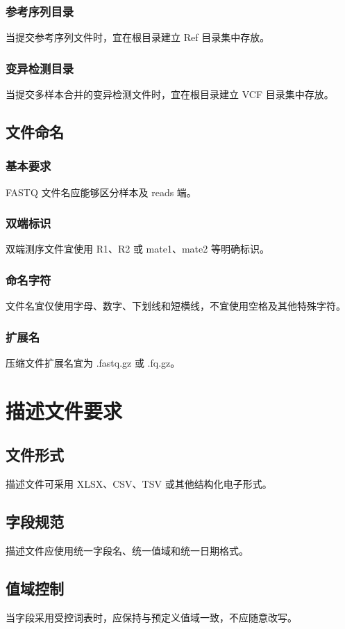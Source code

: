 \subsection{参考序列目录}
当提交参考序列文件时，宜在根目录建立 Ref 目录集中存放。

\subsection{变异检测目录}
当提交多样本合并的变异检测文件时，宜在根目录建立 VCF 目录集中存放。

\section{文件命名}
\subsection{基本要求}
FASTQ 文件名应能够区分样本及 reads 端。

\subsection{双端标识}
双端测序文件宜使用 R1、R2 或 mate1、mate2 等明确标识。

\subsection{命名字符}
文件名宜仅使用字母、数字、下划线和短横线，不宜使用空格及其他特殊字符。

\subsection{扩展名}
压缩文件扩展名宜为 .fastq.gz 或 .fq.gz。

\chapter{描述文件要求}
\section{文件形式}
描述文件可采用 XLSX、CSV、TSV 或其他结构化电子形式。

\section{字段规范}
描述文件应使用统一字段名、统一值域和统一日期格式。

\section{值域控制}
当字段采用受控词表时，应保持与预定义值域一致，不应随意改写。

